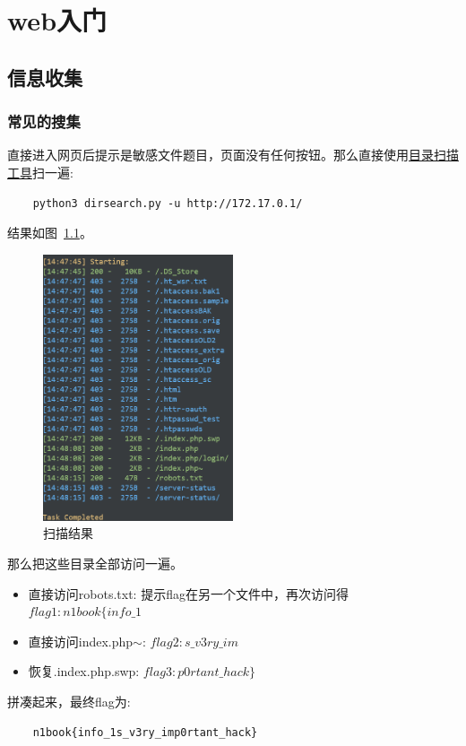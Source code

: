\chapter{web入门}
\section{信息收集}
\subsection{常见的搜集}
直接进入网页后提示是敏感文件题目，页面没有任何按钮。那么直接使用\href{https://github.com/maurosoria/dirsearch}{目录扫描工具}扫一遍:
\begin{lstlisting}
    python3 dirsearch.py -u http://172.17.0.1/
\end{lstlisting}
结果如图~\ref{fig:pic1}。
\begin{figure}[H]
    \centering
    \includegraphics[width=0.5\textwidth]{1-web_junior/pic/1.jpg}
    \caption{扫描结果}
    \label{fig:pic1}
\end{figure}
那么把这些目录全部访问一遍。
\begin{itemize}
    \item 直接访问robots.txt: 提示flag在另一个文件中，再次访问得$ flag1:n1book\{info\_1 $
    \item 直接访问index.php$\sim$: $ flag2:s\_v3ry\_im $
    \item 恢复.index.php.swp: $ flag3:p0rtant\_hack\} $
\end{itemize}
拼凑起来，最终flag为:
\begin{lstlisting}
    n1book{info_1s_v3ry_imp0rtant_hack}
\end{lstlisting}

